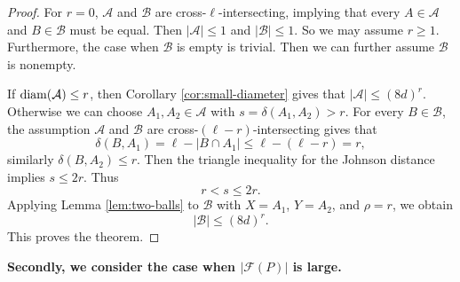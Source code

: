 \documentclass[11pt]{article}
\numberwithin{equation}{section}
\begin{document}
	\begin{proof}
		For $r=0$, $\mathcal A$ and $\mathcal B$ are cross-$\ell$-intersecting, implying that every $A\in\mathcal A$ and $B\in\mathcal B$ must be equal. Then $|\mathcal{A}|\le 1$ and $|\mathcal{B}|\le 1$.  So we may assume $r\ge 1$. Furthermore, the case when $\mathcal{B}$ is empty is trivial. Then we can further assume $\mathcal{B}$ is nonempty.
		
		If ${\rm{diam}} (\mathcal A)\le r$, then Corollary \ref{cor:small-diameter} gives that
		$
		|\mathcal A|\le (8d)^r.
		$
		Otherwise we can choose $A_1,A_2\in\mathcal A$ with
		$
		s=\delta(A_1,A_2)>r.
	$
		For every $B\in\mathcal B$, the assumption $\mathcal{A}$ and $\mathcal{B}$  are cross-$(\ell-r)$-intersecting gives that
	$$
		\delta(B,A_1)=\ell-|B\cap A_1|\le \ell-(\ell-r)=r,
		$$
		similarly $\delta(B,A_2)\le r$.
		Then the triangle inequality for the Johnson distance implies $s\le 2r$.  Thus
		\[
		r<s\le 2r.
		\]
		Applying Lemma \ref{lem:two-balls} to $\mathcal B$ with $X=A_1$, $Y=A_2$, and $\rho=r$, we obtain
		\[
		|\mathcal B|\le (8d)^r.
		\]
		This proves the theorem.
	\end{proof}
	
\smallskip

\textbf{Secondly, we consider the case when $|\mathcal F(P)|$ is large.}


\medskip
\end{document}
